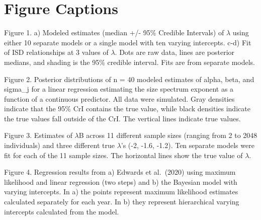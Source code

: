 \documentclass[
  12pt,
]{article}
\begin{document}
\newpage

\hypertarget{figure-captions}{%
\section{Figure Captions}\label{figure-captions}}

Figure 1. a) Modeled estimates (median +/- 95\% Credible Intervals) of
\(\lambda\) using either 10 separate models or a single model with ten
varying intercepts. c-d) Fit of ISD relationships at 3 values of
\(\lambda\). Dots are raw data, lines are posterior medians, and shading
is the 95\% credible interval. Fits are from separate models.

Figure 2. Posterior distributions of n = 40 modeled estimates of alpha,
beta, and sigma\_j for a linear regression estimating the size spectrum
exponent as a function of a continuous predictor. All data were
simulated. Gray densities indicate that the 95\% CrI contains the true
value, while black densities indicate the true values fall outside of
the CrI. The vertical lines indicate true values.

Figure 3. Estimates of \(\lambda\)B across 11 different sample sizes
(ranging from 2 to 2048 individuals) and three different true
\(\lambda\)'s (-2, -1.6, -1.2). Ten separate models were fit for each of
the 11 sample sizes. The horizontal lines show the true value of
\(\lambda\).

Figure 4. Regression results from a) Edwards et al.~(2020) using maximum
likelihood and linear regression (two steps) and b) the Bayesian model
with varying intercepts. In a) the points represent maximum likelihood
estimates calculated separately for each year. In b) they represent
hierarchical varying intercepts calculated from the model.
\end{document}
